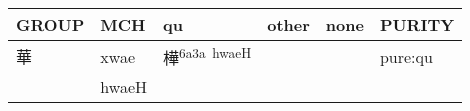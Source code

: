 \documentclass[14pt,a4paper]{scrartcl}
\begin{document}
\begin{longtable}[c]{@{}llllll@{}}
\toprule
\begin{minipage}[b]{0.14\columnwidth}\raggedright\strut
GROUP
\strut\end{minipage} &
\begin{minipage}[b]{0.14\columnwidth}\raggedright\strut
MCH
\strut\end{minipage} &
\begin{minipage}[b]{0.14\columnwidth}\raggedright\strut
qu
\strut\end{minipage} &
\begin{minipage}[b]{0.14\columnwidth}\raggedright\strut
other
\strut\end{minipage} &
\begin{minipage}[b]{0.14\columnwidth}\raggedright\strut
none
\strut\end{minipage} &
\begin{minipage}[b]{0.14\columnwidth}\raggedright\strut
PURITY
\strut\end{minipage}\tabularnewline
\midrule
\endhead
\begin{minipage}[t]{0.14\columnwidth}\raggedright\strut
華
\strut\end{minipage} &
\begin{minipage}[t]{0.14\columnwidth}\raggedright\strut
xwae
\strut\end{minipage} &
\begin{minipage}[t]{0.14\columnwidth}\raggedright\strut
樺\textsuperscript{6a3a~hwaeH}
\strut\end{minipage} &
\begin{minipage}[t]{0.14\columnwidth}\raggedright\strut
\strut\end{minipage} &
\begin{minipage}[t]{0.14\columnwidth}\raggedright\strut
\strut\end{minipage} &
\begin{minipage}[t]{0.14\columnwidth}\raggedright\strut
pure:qu
\strut\end{minipage}\tabularnewline
\begin{minipage}[t]{0.14\columnwidth}\raggedright\strut
𦾓
\strut\end{minipage} &
\begin{minipage}[t]{0.14\columnwidth}\raggedright\strut
hwaeH
\strut\end{minipage} &
\begin{minipage}[t]{0.14\columnwidth}\raggedright\strut
\strut\end{minipage} &

\end{longtable}
\end{document}
